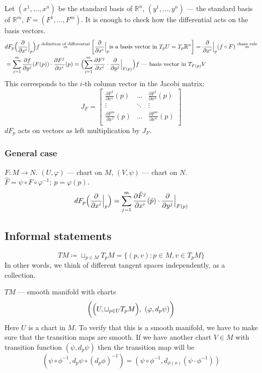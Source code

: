 Let $(x^1, \dots, x^n)$ be the standard basis of $\mathbb{R}^n$, 
$(y^1, \dots, y^n)$ --- the standard basis of $\mathbb{R}^m$,
$F = (F^1, \dots, F^m)$.
It is enough to check how the differential acts on the basis vectors.
\begin{align*}
    &
    dF_p\Bigl(\frac{\partial}{\partial x^i} \Big|_p\Bigr) f 
    \overset{\text{definition of differential}}{=}
    \left[\frac{\partial}{\partial x^i} \Big|_p \text{is a basis vector in }
     T_p U = T_p \mathbb{R}^n\right] 
    =
    \frac{\partial}{\partial x^i} \Big|_p (f \circ F)
    \overset{\text{chain rule}}{=}\\&=
    \sum_{j=1}^m \frac{\partial f}{\partial y^j}(F(p))
    \cdot \frac{\partial F^j}{\partial x^i}(p) = 
    \Bigl(\sum_{j=1}^m \frac{\partial F^j}{\partial x^i} \cdot
    \frac{\partial}{\partial y^j}\Big|_{F(p)}\Bigr) f
    \text{ --- basis vector in } T_{F(p)} V
\end{align*}
This corresponds to the $i$-th column vector in the Jacobi matrix:
\[
    J_F = \begin{bmatrix}
        \frac{\partial F^1}{\partial x^1}(p) & \dots & \frac{\partial F^1}{\partial x^n}(p)\\
        \vdots & \ddots & \vdots \\
        \frac{\partial F^m}{\partial x^1}(p) & \dots & \frac{\partial F^m}{\partial x^n}(p)\\
    \end{bmatrix}
\]
$dF_p$ acts on vectors as left multiplication by $J_F$.
\subsubsection*{General case}
$F : M \to N$. $(U, \varphi)$ --- chart on $M$, $(V, \psi)$ --- chart on $N$.
$\hat{F} = \psi \circ F \circ \varphi^{-1};\ \hat{p} = \varphi(p)$.
\[
    dF_p\Bigl(\frac{\partial}{\partial x^i}\Big|_p\Bigr) = 
    \sum_{j=1}^m \frac{\partial \hat{F}^j}{\partial x^i}(\hat{p}) 
    \cdot \frac{\partial}{\partial y^j}\Big|_{F(p)}
\]

\subsection{Informal statements}
\begin{definition}
    \[ TM \coloneqq \sqcup_{p \in M} T_p M  = \{
        (p, v): p \in M, v \in T_p M
    \}\]
    In other words, we think of different tangent spaces independently,
    as a collection.
\end{definition}
$TM$ --- smooth manifold with charts
\[ 
    \biggl(\Bigl(U, \sqcup_{p \in U} T_p M\Bigr),\ (\varphi, d_p \psi)\biggr)
\]
Here $U$ is a chart in $M$.
To verify that this is a smooth manifold, we have to make sure that the
transition maps are smooth.
If we have another chart $V \in M$ with transition function
$(\psi, d_p \psi)$ then the transition map will be
\[ 
    (\psi \circ \phi^{-1}, d_p \psi \circ (d_p \phi)^{-1}) = 
    (\psi \circ \phi^{-1}, d_{\phi(o)}(\psi \cdot \phi^{-1}))
\]